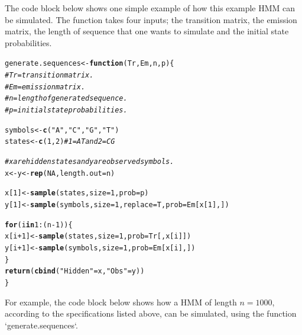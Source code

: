 \documentclass{article}\usepackage[]{graphicx}\usepackage[]{color}
\makeatletter
\newcommand{\hlnum}[1]{\textcolor[rgb]{0.686,0.059,0.569}{#1}}%
\newcommand{\hlstr}[1]{\textcolor[rgb]{0.192,0.494,0.8}{#1}}%
\newcommand{\hlcom}[1]{\textcolor[rgb]{0.678,0.584,0.686}{\textit{#1}}}%
\newcommand{\hlopt}[1]{\textcolor[rgb]{0,0,0}{#1}}%
\newcommand{\hlstd}[1]{\textcolor[rgb]{0.345,0.345,0.345}{#1}}%
\newcommand{\hlkwa}[1]{\textcolor[rgb]{0.161,0.373,0.58}{\textbf{#1}}}%
\newcommand{\hlkwb}[1]{\textcolor[rgb]{0.69,0.353,0.396}{#1}}%
\newcommand{\hlkwc}[1]{\textcolor[rgb]{0.333,0.667,0.333}{#1}}%
\newcommand{\hlkwd}[1]{\textcolor[rgb]{0.737,0.353,0.396}{\textbf{#1}}}%
\newenvironment{kframe}{%
 \def\at@end@of@kframe{}%
 \ifinner\ifhmode%
  \def\at@end@of@kframe{\end{minipage}}%
  \begin{minipage}{\columnwidth}%
 \fi\fi%
 \def\FrameCommand##1{\hskip\@totalleftmargin \hskip-\fboxsep
 \colorbox{shadecolor}{##1}\hskip-\fboxsep
     \hskip-\linewidth \hskip-\@totalleftmargin \hskip\columnwidth}%
 \MakeFramed {\advance\hsize-\width
   \@totalleftmargin\z@ \linewidth\hsize
   \@setminipage}}%
 {\par\unskip\endMakeFramed%
 \at@end@of@kframe}
\newenvironment{knitrout}{}{} %
\makeatother
\begin{document}
The code block below shows one simple example of how this example HMM can be simulated. The function takes four inputs; the transition matrix, the emission matrix, the length of sequence that one wants to simulate and the initial state probabilities. 

\begin{knitrout}
\color{fgcolor}\begin{kframe}
\begin{alltt}
\hlstd{generate.sequences} \hlkwb{<-} \hlkwa{function}\hlstd{(}\hlkwc{Tr}\hlstd{,} \hlkwc{Em}\hlstd{,} \hlkwc{n}\hlstd{,} \hlkwc{p}\hlstd{)\{}
    \hlcom{# Tr = transition matrix.}
    \hlcom{# Em = emission matrix.}
    \hlcom{# n = length of generated sequence.}
    \hlcom{# p = initial state probabilities. }

  \hlstd{symbols} \hlkwb{<-} \hlkwd{c}\hlstd{(}\hlstr{"A"}\hlstd{,} \hlstr{"C"}\hlstd{,} \hlstr{"G"}\hlstd{,} \hlstr{"T"}\hlstd{)}
  \hlstd{states} \hlkwb{<-} \hlkwd{c}\hlstd{(}\hlnum{1}\hlstd{,} \hlnum{2}\hlstd{)} \hlcom{# 1 = AT and 2 = CG}

  \hlcom{# x are hidden states and y are observed symbols. }
  \hlstd{x} \hlkwb{<-} \hlstd{y} \hlkwb{<-} \hlkwd{rep}\hlstd{(}\hlnum{NA}\hlstd{,} \hlkwc{length.out} \hlstd{= n)}

  \hlstd{x[}\hlnum{1}\hlstd{]} \hlkwb{<-} \hlkwd{sample}\hlstd{(states,} \hlkwc{size} \hlstd{=} \hlnum{1}\hlstd{,} \hlkwc{prob} \hlstd{= p)}
  \hlstd{y[}\hlnum{1}\hlstd{]} \hlkwb{<-} \hlkwd{sample}\hlstd{(symbols,} \hlkwc{size} \hlstd{=} \hlnum{1}\hlstd{,}\hlkwc{replace}\hlstd{=T,}\hlkwc{prob} \hlstd{= Em[x[}\hlnum{1}\hlstd{],])}

  \hlkwa{for}\hlstd{(i} \hlkwa{in} \hlnum{1}\hlopt{:}\hlstd{(n}\hlopt{-}\hlnum{1}\hlstd{))\{}
    \hlstd{x[i}\hlopt{+}\hlnum{1}\hlstd{]} \hlkwb{<-} \hlkwd{sample}\hlstd{(states,} \hlkwc{size} \hlstd{=} \hlnum{1}\hlstd{,} \hlkwc{prob} \hlstd{= Tr[,x[i]])}
    \hlstd{y[i}\hlopt{+}\hlnum{1}\hlstd{]} \hlkwb{<-} \hlkwd{sample}\hlstd{(symbols,} \hlkwc{size} \hlstd{=} \hlnum{1}\hlstd{,} \hlkwc{prob} \hlstd{= Em[x[i], ])}
  \hlstd{\}}
  \hlkwd{return}\hlstd{(}\hlkwd{cbind}\hlstd{(}\hlstr{"Hidden"} \hlstd{= x,} \hlstr{"Obs"} \hlstd{= y))}
\hlstd{\}}
\end{alltt}
\end{kframe}
\end{knitrout}

For example, the code block below shows how a HMM of length $n = 1000$, according to the specifications listed above, can be simulated, using the function `generate.sequences`.
\end{document}
